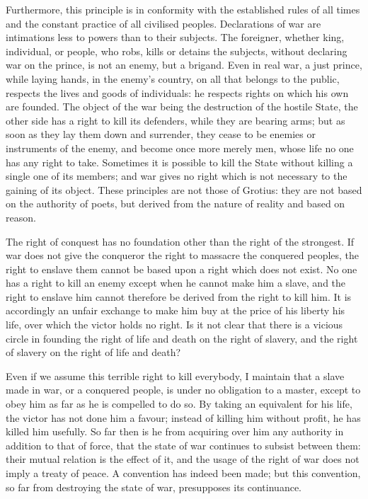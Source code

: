 \documentclass[12pt]{book}
\begin{document}
Furthermore, this principle is in conformity with the established rules of all times and the constant practice of all civilised peoples. Declarations of war are intimations less to powers than to their subjects. The foreigner, whether king, individual, or people, who robs, kills or detains the subjects, without declaring war on the prince, is not an enemy, but a brigand. Even in real war, a just prince, while laying hands, in the enemy's country, on all that belongs to the public, respects the lives and goods of individuals: he respects rights on which his own are founded. The object of the war being the destruction of the hostile State, the other side has a right to kill its defenders, while they are bearing arms; but as soon as they lay them down and surrender, they cease to be enemies or instruments of the enemy, and become once more merely men, whose life no one has any right to take. Sometimes it is possible to kill the State without killing a single one of its members; and war gives no right which is not necessary to the gaining of its object. These principles are not those of Grotius: they are not based on the authority of poets, but derived from the nature of reality and based on reason.

The right of conquest has no foundation other than the right of the strongest. If war does not give the conqueror the right to massacre the conquered peoples, the right to enslave them cannot be based upon a right which does not exist. No one has a right to kill an enemy except when he cannot make him a slave, and the right to enslave him cannot therefore be derived from the right to kill him. It is accordingly an unfair exchange to make him buy at the price of his liberty his life, over which the victor holds no right. Is it not clear that there is a vicious circle in founding the right of life and death on the right of slavery, and the right of slavery on the right of life and death?

Even if we assume this terrible right to kill everybody, I maintain that a slave made in war, or a conquered people, is under no obligation to a master, except to obey him as far as he is compelled to do so. By taking an equivalent for his life, the victor has not done him a favour; instead of killing him without profit, he has killed him usefully. So far then is he from acquiring over him any authority in addition to that of force, that the state of war continues to subsist between them: their mutual relation is the effect of it, and the usage of the right of war does not imply a treaty of peace. A convention has indeed been made; but this convention, so far from destroying the state of war, presupposes its continuance.
\end{document}
